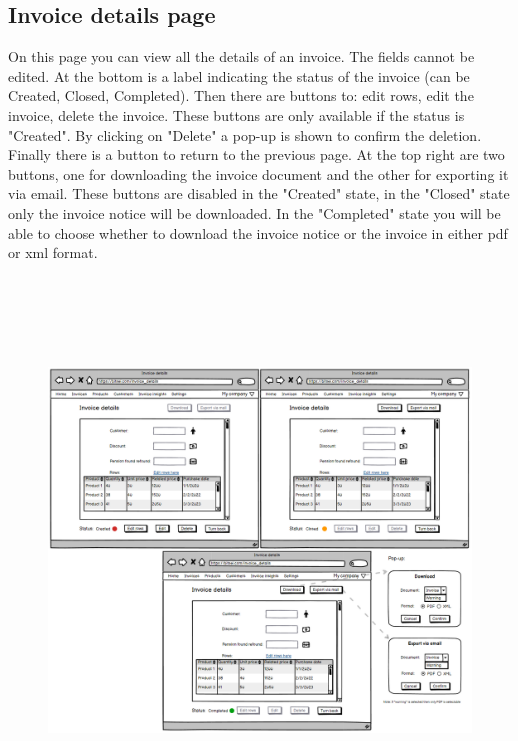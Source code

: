 \subsection{Invoice details page}
On this page you can view all the details of an invoice. The fields cannot be edited. At the bottom is a label indicating the status of the invoice (can be Created, Closed, Completed). Then there are buttons to: edit rows, edit the invoice, delete the invoice. These buttons are only available if the status is "Created". By clicking on "Delete" a pop-up is shown to confirm the deletion. Finally there is a button to return to the previous page.
At the top right are two buttons, one for downloading the invoice document and the other for exporting it via email. These buttons are disabled in the "Created" state, in the "Closed" state only the invoice notice will be downloaded. In the "Completed" state you will be able to choose whether to download the invoice notice or the invoice in either pdf or xml format.
\begin{figure}[h!]
    \centering
    \includegraphics[height=410pt, keepaspectratio]{resources/mockup/Invoice_details.png}
\end{figure}
\newpage

